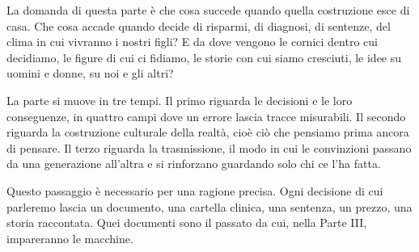 La domanda di questa parte è che cosa succede quando quella costruzione esce di casa. Che cosa accade quando decide di risparmi, di diagnosi, di sentenze, del clima in cui vivranno i nostri figli? E da dove vengono le cornici dentro cui decidiamo, le figure di cui ci fidiamo, le storie con cui siamo cresciuti, le idee su uomini e donne, su noi e gli altri?

La parte si muove in tre tempi. Il primo riguarda le decisioni e le loro conseguenze, in quattro campi dove un errore lascia tracce misurabili. Il secondo riguarda la costruzione culturale della realtà, cioè ciò che pensiamo prima ancora di pensare. Il terzo riguarda la trasmissione, il modo in cui le convinzioni passano da una generazione all'altra e si rinforzano guardando solo chi ce l'ha fatta.

Questo passaggio è necessario per una ragione precisa. Ogni decisione di cui parleremo lascia un documento, una cartella clinica, una sentenza, un prezzo, una storia raccontata. Quei documenti sono il passato da cui, nella Parte III, impareranno le macchine.

\cleardoublepage
